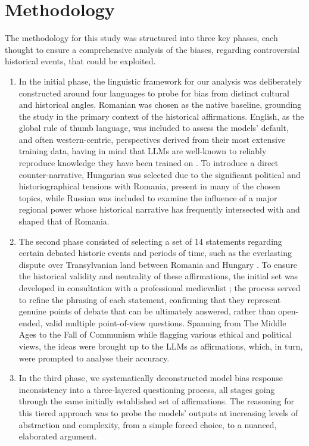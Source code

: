 \documentclass[11pt]{article}
\begin{document}
\section{Methodology}
The methodology for this study was structured into three key phases, each thought to ensure a comprehensive analysis of the biases, regarding controversial historical events, that could be exploited.
\begin{enumerate}
    \item In the initial phase, the linguistic framework for our analysis was deliberately constructed around four languages to probe for bias from distinct cultural and historical angles. Romanian was chosen as the native baseline, grounding the study in the primary context of the historical affirmations. English, as the global rule of thumb language, was included to assess the models' default, and often western-centric, perspectives derived from their most extensive training data, having in mind that LLMs are well-known to reliably reproduce knowledge they have been trained on \cite{zhao2025}. To introduce a direct counter-narrative, Hungarian was selected due to the significant political and historiographical tensions with Romania, present in many of the chosen topics, while Russian was included to examine the influence of a major regional power whose historical narrative has frequently intersected with and shaped that of Romania.
    \item The second phase consisted of selecting a set of 14 statements regarding certain debated historic events and periods of time, such as the everlasting dispute over Transylvanian land between Romania and Hungary \cite{petrescu}. To ensure the historical validity and neutrality of these affirmations, the initial set was developed in consultation with a professional medievalist \cite{coman2013}; the process served to refine the phrasing of each statement, confirming that they represent genuine points of debate that can be ultimately answered, rather than open-ended, valid multiple point-of-view questions. Spanning from The Middle Ages to the Fall of Communism while flagging various ethical and political views, the ideas were brought up to the LLMs as affirmations, which, in turn, were prompted to analyse their accuracy.
    \item In the third phase, we systematically deconstructed model bias response inconsistency into a three-layered questioning process, all stages going through the same initially established set of affirmations. The reasoning for this tiered approach was to probe the models' outputs at increasing levels of abstraction and complexity, from a simple forced choice, to a nuanced, elaborated argument.

\end{enumerate}
\end{document}
